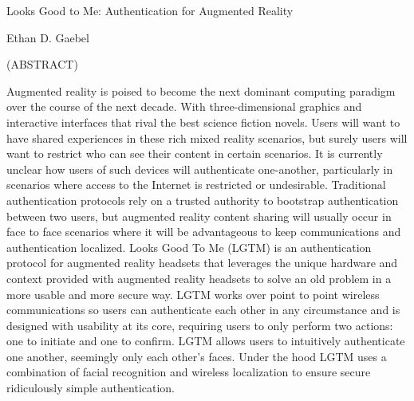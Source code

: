 \documentclass[12pt]{report}
\begin{document}
\thispagestyle{empty}
\begin{center}

{\large Looks Good to Me: 
Authentication for Augmented Reality}

\vfill

Ethan D. Gaebel

\vfill

(ABSTRACT)


Augmented reality is poised to become the next dominant computing paradigm over the course of the next decade. With three-dimensional graphics and interactive interfaces that rival the best science fiction novels. Users will want to have shared experiences in these rich mixed reality scenarios, but surely users will want to restrict who can see their content in certain scenarios. It is currently unclear how users of such devices will authenticate one-another, particularly in scenarios where access to the Internet is restricted or undesirable. Traditional authentication protocols rely on a trusted authority to bootstrap authentication between two users, but augmented reality content sharing will usually occur in face to face scenarios where it will be advantageous to keep communications and authentication localized. Looks Good To Me (LGTM) is an authentication protocol for augmented reality headsets that leverages the unique hardware and context provided with augmented reality headsets to solve an old problem in a more usable and more secure way. LGTM works over point to point wireless communications so users can authenticate each other in any circumstance and is designed with usability at its core, requiring users to only perform two actions: one to initiate and one to confirm. LGTM allows users to intuitively authenticate one another, seemingly only each other's faces. Under the hood LGTM uses a combination of facial recognition and wireless localization to ensure secure ridiculously simple authentication.

\vfill

\end{center}
\end{document}
